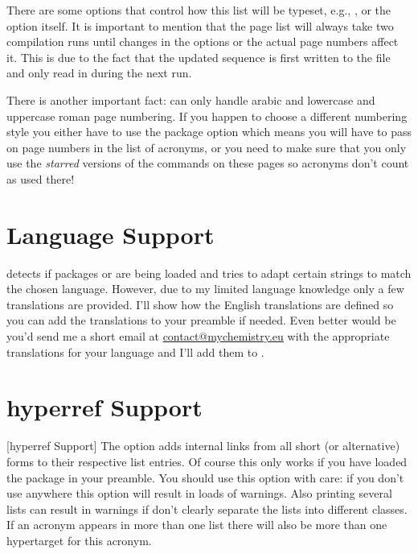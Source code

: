 \documentclass[DIV10,toc=index,toc=bib,hyperfootnotes=false]{cnpkgdoc}
\begin{document}
There are some options that control how this list will be typeset, e.g.,
,  or the option  itself. It is
important to mention that the page list will always take two compilation runs
until changes in the options or the actual page numbers affect it. This is due to
the fact that the updated sequence is first written to the  file and
only read in during the next run.

There is another important fact: \acro can only handle arabic and lowercase and
uppercase roman page numbering. If you happen to choose a different numbering
style you either have to use the package option  which
means you will have to pass on page numbers in the list of acronyms, or you need
to make sure that you only use the \emph{starred} versions of the  commands
on these pages so acronyms don't count as used there!

\section{Language Support}
\acro detects if packages  or  are being loaded
and tries to adapt certain strings to match the chosen language. However, due
to my limited language knowledge only a few translations are provided. I'll
show how the English translations are defined so you can add the translations
to your preamble if needed. Even better would be you'd send me a short email
at \href{mailto:contact@mychemistry.eu}{contact@mychemistry.eu} with the
appropriate translations for your language and I'll add them to \acro.

\begin{beispiel}
\end{beispiel}

\section{hyperref Support}[hyperref Support]
The option  adds internal links from all short (or alternative)
forms to their respective list entries. Of course this only works if you have
loaded the  package in your preamble. You should use this option
with care: if you don't use  anywhere this option will result
in loads of  warnings. Also printing several lists can result in
warnings if don't clearly separate the lists into different classes. If an acronym
appears in more than one list there will also be more than one hypertarget for this
acronym.
\end{document}
